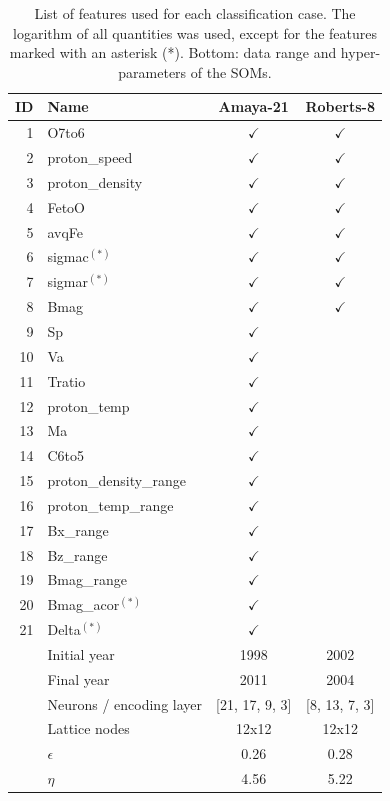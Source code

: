 \documentclass[utf8]{frontiersSCNS} %
\begin{document}
\begin{table}\centering
	\begin{tabular}{@{}rlcc@{}}
		\toprule
		ID & Name  & Amaya-21 & Roberts-8 \\
		\midrule
		1 & O7to6 & $\checkmark$ & $\checkmark$ \\
		2 & proton\_speed & $\checkmark$ & $\checkmark$ \\
		3 & proton\_density & $\checkmark$ & $\checkmark$ \\
		4 & FetoO & $\checkmark$ & $\checkmark$ \\
		5 & avqFe & $\checkmark$ & $\checkmark$ \\
		6 & sigmac$^{(*)}$ & $\checkmark$ & $\checkmark$ \\
		7 & sigmar$^{(*)}$ & $\checkmark$ & $\checkmark$ \\
		8 & Bmag & $\checkmark$ & $\checkmark$ \\
		9 & Sp & $\checkmark$ & \\
		10 & Va & $\checkmark$ & \\
		11 & Tratio & $\checkmark$ & \\
		12 & proton\_temp & $\checkmark$ & \\
		13 & Ma & $\checkmark$ & \\
		14 & C6to5 & $\checkmark$ & \\
		15 & proton\_density\_range & $\checkmark$ & \\
		16 & proton\_temp\_range & $\checkmark$ & \\
		17 & Bx\_range & $\checkmark$ & \\
		18 & Bz\_range & $\checkmark$ & \\
		19 & Bmag\_range & $\checkmark$ & \\
		20 & Bmag\_acor$^{(*)}$ & $\checkmark$ & \\
		21 & Delta$^{(*)}$ & $\checkmark$ & \\
		\midrule
		 & Initial year & 1998 & 2002 \\
		 & Final year & 2011 & 2004 \\
		 & Neurons / encoding layer & [21, 17, 9, 3] & [8, 13, 7, 3] \\
		 & Lattice nodes &  12x12 &  12x12 \\
		 & $\epsilon$ &  0.26 & 0.28 \\
		 & $\eta$ & 4.56 & 5.22 \\
		\bottomrule
	\end{tabular}
	\caption{List of features used for each classification case. The logarithm of all quantities was used, except for the features marked with an asterisk (*). Bottom: data range and hyper-parameters of the SOMs.}
	\label{tab:features}
\end{table}
\end{document}
